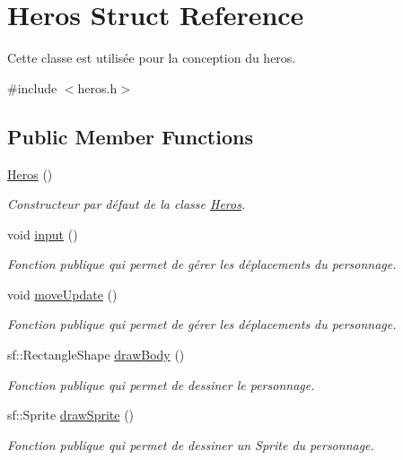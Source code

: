 \hypertarget{classHeros}{}\section{Heros Struct Reference}
\label{classHeros}


Cette classe est utilisée pour la conception du heros.  




{\ttfamily \#include $<$heros.\+h$>$}

\subsection*{Public Member Functions}
\begin{DoxyCompactItemize}
\item 
\hyperlink{classHeros_ab4c8bc5b87a080c5f609a65bfab62c48}{Heros} ()
\begin{DoxyCompactList}\small\item\em Constructeur par défaut de la classe \hyperlink{classHeros}{Heros}. \end{DoxyCompactList}\item 
void \hyperlink{classHeros_a2b419e2ab89d707eb9d12e7f5ded93f6}{input} ()\hypertarget{classHeros_a2b419e2ab89d707eb9d12e7f5ded93f6}{}\label{classHeros_a2b419e2ab89d707eb9d12e7f5ded93f6}

\begin{DoxyCompactList}\small\item\em Fonction publique qui permet de gérer les déplacements du personnage. \end{DoxyCompactList}\item 
void \hyperlink{classHeros_a8bd0a59ced85f4b2836b78025f5f9c0e}{move\+Update} ()\hypertarget{classHeros_a8bd0a59ced85f4b2836b78025f5f9c0e}{}\label{classHeros_a8bd0a59ced85f4b2836b78025f5f9c0e}

\begin{DoxyCompactList}\small\item\em Fonction publique qui permet de gérer les déplacements du personnage. \end{DoxyCompactList}\item 
sf\+::\+Rectangle\+Shape \hyperlink{classHeros_a2442a5084167c02f2a92bb5ad3691365}{draw\+Body} ()\hypertarget{classHeros_a2442a5084167c02f2a92bb5ad3691365}{}\label{classHeros_a2442a5084167c02f2a92bb5ad3691365}

\begin{DoxyCompactList}\small\item\em Fonction publique qui permet de dessiner le personnage. \end{DoxyCompactList}\item 
sf\+::\+Sprite \hyperlink{classHeros_ad8209e411c38c4a1b971fd93227d25d4}{draw\+Sprite} ()\hypertarget{classHeros_ad8209e411c38c4a1b971fd93227d25d4}{}\label{classHeros_ad8209e411c38c4a1b971fd93227d25d4}

\begin{DoxyCompactList}\small\item\em Fonction publique qui permet de dessiner un Sprite du personnage. \end{DoxyCompactList}\end{DoxyCompactItemize}


